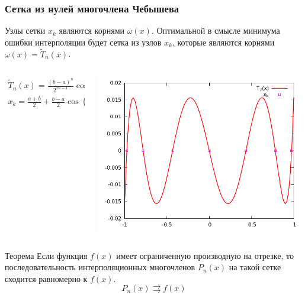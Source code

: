 \documentclass[aspectratio=169,unicode]{beamer}
\begin{document}
\begin{frame}
\frametitle{Сетка из нулей многочлена Чебышева}
	Узлы сетки $x_k$ являются корнями $\omega(x)$. Оптимальной в смысле минимума ошибки интерполяции будет
	сетка из узлов $x_k$, которые являются корнями $\omega(x) = \tilde{T}_n(x)$.
	\pause
	\begin{columns}[T]
	\begin{column}{0.6\textwidth}
	\begin{gather*}
	\tilde{T}_n(x) = \frac{(b-a)^n}{2^{2n-1}}
		\cos n \arccos \frac{2x-a-b}{b-a}\\
	x_k = \frac{a+b}{2} + \frac{b-a}{2} \cos \left(\frac{2k-1}{2n}\pi\right)
	\end{gather*}
	\end{column}
	\begin{column}{0.4\textwidth}
	\includegraphics[height=0.3\textheight]{cheb.png}
	\end{column}
	\end{columns}
	\pause

	\begin{block}{Теорема}
		Если функция $f(x)$ имеет ограниченную производную на отрезке, то последовательность
		интерполяционных многочленов $P_n(x)$ на такой сетке сходится равномерно к $f(x)$.
		\[
		P_n(x) \rightrightarrows f(x)
		\]
	\end{block}
\end{frame}
\end{document}
